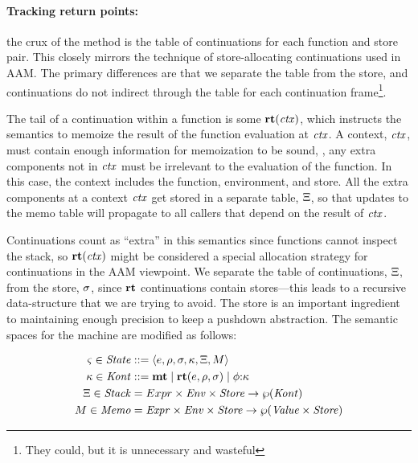 \paragraph{Tracking return points:} the crux of the method is the table of continuations for each function and store pair.
%
This closely mirrors the technique of store-allocating continuations used in AAM.
%
The primary differences are that we separate the table from the store, and continuations do not indirect through the table for each continuation frame\footnote{They could, but it is unnecessary and wasteful}.

The tail of a continuation within a function is some $\mathbf{rt}(\mathit{ctx})$, which instructs the semantics to memoize the result of the function evaluation at $\mathit{ctx}$.
%
A context, $\mathit{ctx}$, must contain enough information for memoization to be sound, \ie, any extra components not in $\mathit{ctx}$ must be irrelevant to the evaluation of the function.
%
In this case, the context includes the function, environment, and store.
%
All the extra components at a context $\mathit{ctx}$ get stored in a separate table, $\Xi$, so that updates to the memo table will propagate to all callers that depend on the result of $\mathit{ctx}$.

Continuations count as ``extra'' in this semantics since functions cannot inspect the stack, so $\mathbf{rt}(\mathit{ctx})$ might be considered a special allocation strategy for continuations in the AAM viewpoint.
%
We separate the table of continuations, $\Xi$, from the store, $\sigma$, since $\mathbf{rt}$ continuations contain stores---this leads to a recursive data-structure that we are trying to avoid.
%
The store is an important ingredient to maintaining enough precision to keep a pushdown abstraction.
%
The semantic spaces for the machine are modified as follows:

\begin{align*}
  \varsigma \in \mathit{State} &::= \langle e,\rho,\sigma,\kappa,\Xi,M \rangle \\
  \kappa \in \mathit{Kont} &::= \mathbf{mt} \mathrel{\mid} \mathbf{rt}(e,\rho,\sigma) \mathrel{\mid} \phi{\tt :} \kappa \\
  \Xi \in \mathit{Stack} &= Expr \times \mathit{Env}\times \mathit{Store} \to \wp(\mathit{Kont}) \\
  M \in \mathit{Memo} &= \mathit{Expr} \times \mathit{Env}\times \mathit{Store} \to \wp(\mathit{Value} \times \mathit{Store})
\end{align*}

